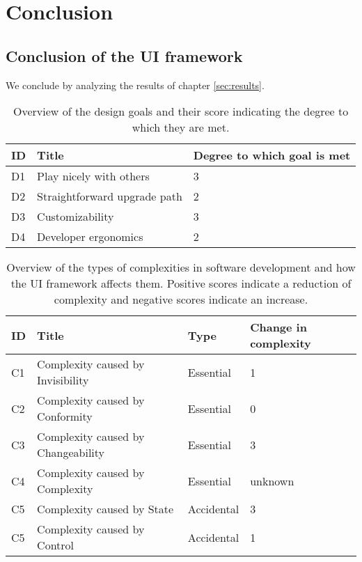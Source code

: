 \section{Conclusion}\label{conclusion}

\subsection{Conclusion of the UI framework}
We conclude by analyzing the results of chapter \ref{sec:results}.

\begin{table}[!htb]
  \begin{center}
    \begin{tabular}{|l|l|l|}
      \hline
      \textbf{ID} & \textbf{Title} & \textbf{Degree to which goal is met} \\
      \hline
      D1 & Play nicely with others & 3 \\
      \hline
      D2 & Straightforward upgrade path & 2 \\
      \hline
      D3 & Customizability & 3 \\
      \hline
      D4 & Developer ergonomics & 2 \\
      \hline
    \end{tabular}
    \caption{Overview of the design goals and their score indicating the degree to which they are met.}
  \end{center}
\end{table}

\begin{table}[!htb]
  \begin{center}
    \begin{tabular}{|l|l|l|l|}
      \hline
      \textbf{ID} & \textbf{Title} & \textbf{Type} & \textbf{Change in complexity} \\
      \hline
      C1 & Complexity caused by Invisibility & Essential & 1 \\
      \hline
      C2 & Complexity caused by Conformity & Essential & 0 \\
      \hline
      C3 & Complexity caused by Changeability & Essential & 3 \\
      \hline
      C4 & Complexity caused by Complexity & Essential & unknown \\
      \hline
      C5 & Complexity caused by State & Accidental & 3 \\
      \hline
      C5 & Complexity caused by Control & Accidental & 1 \\
      \hline
    \end{tabular}
    \caption{Overview of the types of complexities in software development and how the UI framework affects them. Positive scores indicate a reduction of complexity and negative scores indicate an increase.}
    \label{tab:summarycomplexity}
  \end{center}
\end{table}

